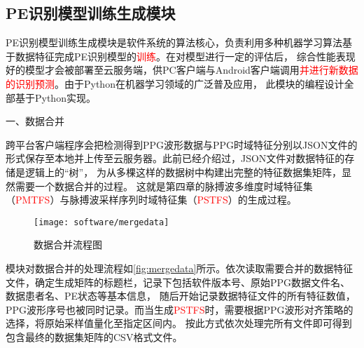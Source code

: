 
\subsection{PE识别模型训练生成模块}
PE识别模型训练生成模块是软件系统的算法核心，负责利用多种机器学习算法基于数据特征完成PE识别模型的\textcolor{red}{训练}。在对模型进行一定的评估后，
综合性能表现好的模型才会被部署至云服务端，供PC客户端与Android客户端调用\textcolor{red}{并进行新数据的识别预测}。由于Python在机器学习领域的广泛普及应用，
此模块的编程设计全部基于Python实现。

一、数据合并

跨平台客户端程序会把检测得到PPG波形数据与PPG时域特征分别以JSON文件的形式保存至本地并上传至云服务器。此前已经介绍过，JSON文件对数据特征的存储是逻辑上的“树”，
为从多棵这样的数据树中构建出完整的特征数据集矩阵，显然需要一个数据合并的过程。
这就是第四章的脉搏波多维度时域特征集（\textcolor{red}{PMTFS}）与脉搏波采样序列时域特征集（\textcolor{red}{PSTFS}）的生成过程。
\begin{figure}[htbp]
    \centering
    \texttt{[image: software/mergedata]}
    \caption{\label{fig:mergedata}数据合并流程图}
\end{figure}

模块对数据合并的处理流程如\autoref{fig:mergedata}所示。依次读取需要合并的数据特征文件，确定生成矩阵的标题栏，记录下包括软件版本号、原始PPG数据文件名、数据患者名、PE状态等基本信息，
随后开始记录数据特征文件的所有特征数值，PPG波形序号也被同时记录。而当生成\textcolor{red}{PSTFS}时，需要根据PPG波形对齐策略的选择，将原始采样值量化至指定区间内。
按此方式依次处理完所有文件即可得到包含最终的数据集矩阵的CSV格式文件。

